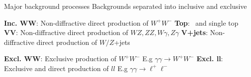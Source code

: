 \documentclass[10pt]{beamer}
\newcommand*{\yyWW}{\ensuremath{\gamma\gamma \to W^+W^-}}
\newcommand*{\yyll}{\ensuremath{\gamma\gamma \to \ell^+\ell^-}}
\newcommand*{\WW}{\ensuremath{W^+W^-}} %
\begin{document}
\begin{frame}{Major background processes}
\centering 
{\large\color{blue} Backgrounds separated into inclusive and exclusive}

\vspace*{\baselineskip}

\begin{tcolorbox}[title=Inclusive Backgrounds, width=\linewidth, colback=white,colframe=cyan,nobeforeafter,tcbox raise base,top=0pt,left=0pt,right=0pt,bottom=0pt]
\begin{outline}
	\1 {\bf Inc. $\boldsymbol{WW}$}: Non-diffractive direct production of \WW
	\1 {\bf Top}: \ttbar\ and single top
	\1 {\bf VV}: Non-diffractive direct production of $WZ,ZZ,W\gamma, Z\gamma$ 
	\1 {\bf V+jets}: Non-diffractive direct production of $W/Z$+jets
\end{outline}
\end{tcolorbox}
\vspace*{\baselineskip}
\begin{tcolorbox}[title=Exclusive Backgrounds, width=\linewidth, colback=white,colframe=red!50!white,nobeforeafter,tcbox raise base,top=0pt,left=0pt,right=0pt,bottom=0pt]
\begin{outline}
	\1 {\bf Excl. $\boldsymbol{WW}$}: Exclusive production of \WW
	 \2 E.g \yyWW
	\1 {\bf Excl. $\boldsymbol{ll}$}: Exclusive and direct production of $ll$
	 \2 E.g \yyll  
\end{outline}
\end{tcolorbox}
\end{frame}
\end{document}

